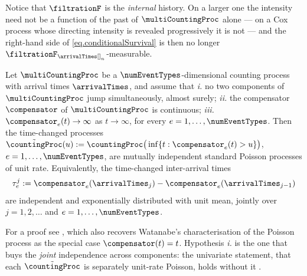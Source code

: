 \begin{remark}\label{remark.internalHistory}
 Notice that $\filtrationF$ is the \emph{internal} history.
 On a larger one the intensity need not be a function of the past of $\multiCountingProc$
 alone --- on a Cox process whose directing intensity is revealed progressively it is not ---
 and the right-hand side of \eqref{eq.conditionalSurvival} is then no longer
 $\filtrationF_{\arrivalTimes[ ]_{n}}$-measurable.
\end{remark}


\begin{thm}\label{thm.meyer1971}
 Let $\multiCountingProc$ be a $\numEventTypes$-dimensional counting process with arrival times
 $\arrivalTimes$, and assume that
 \emph{i.} no two components of $\multiCountingProc$ jump simultaneously, almost surely;
 \emph{ii.} the compensator $\compensator$ of $\multiCountingProc$ is continuous;
 \emph{iii.} $\compensator_{e}(t) \rightarrow \infty$ as $t\rightarrow \infty$,
 for every $e = 1, \dots, \numEventTypes$.
 Then the time-changed processes
 $\tilde{\countingProc}(u) := \countingProc \big( \inf\lbrace t: \compensator_e(t) > u \rbrace \big)$,
 $e = 1, \dots, \numEventTypes$,
 are mutually independent standard Poisson processes of unit rate.
 Equivalently, the time-changed inter-arrival times
 \begin{equation}\label{eq.time-changed_intertimes}
  \tau_e^j := \compensator_e(\arrivalTimes_{j}) - \compensator_e(\arrivalTimes_{j-1})
 \end{equation}
 are independent and exponentially distributed with unit mean,
 jointly over $j = 1, 2, \dots$ and $e = 1,\dots,\numEventTypes$.
\end{thm}

For a proof see \cite{BN88sim}, which also recovers Watanabe's characterisation of the Poisson
process as the special case $\compensator(t) = t$.
Hypothesis \emph{i.} is the one that buys the \emph{joint} independence across components:
the univariate statement, that each $\tilde{\countingProc}$ is separately unit-rate Poisson,
holds without it \citep{Pap72int}.
